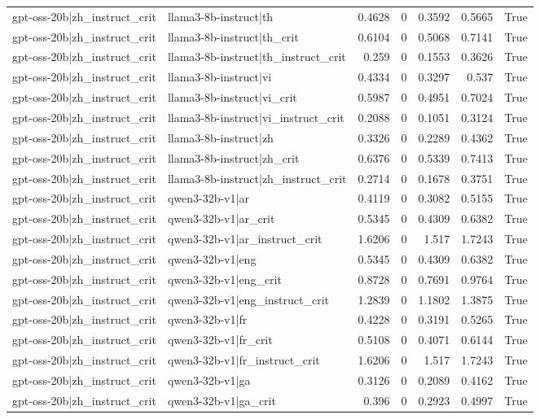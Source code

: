 \begin{table}
\begin{tabular}{l l r r r r l}
gpt-oss-20b|zh_instruct_crit & llama3-8b-instruct|th & 0.4628 & 0 & 0.3592 & 0.5665 & True \\
gpt-oss-20b|zh_instruct_crit & llama3-8b-instruct|th_crit & 0.6104 & 0 & 0.5068 & 0.7141 & True \\
gpt-oss-20b|zh_instruct_crit & llama3-8b-instruct|th_instruct_crit & 0.259 & 0 & 0.1553 & 0.3626 & True \\
gpt-oss-20b|zh_instruct_crit & llama3-8b-instruct|vi & 0.4334 & 0 & 0.3297 & 0.537 & True \\
gpt-oss-20b|zh_instruct_crit & llama3-8b-instruct|vi_crit & 0.5987 & 0 & 0.4951 & 0.7024 & True \\
gpt-oss-20b|zh_instruct_crit & llama3-8b-instruct|vi_instruct_crit & 0.2088 & 0 & 0.1051 & 0.3124 & True \\
gpt-oss-20b|zh_instruct_crit & llama3-8b-instruct|zh & 0.3326 & 0 & 0.2289 & 0.4362 & True \\
gpt-oss-20b|zh_instruct_crit & llama3-8b-instruct|zh_crit & 0.6376 & 0 & 0.5339 & 0.7413 & True \\
gpt-oss-20b|zh_instruct_crit & llama3-8b-instruct|zh_instruct_crit & 0.2714 & 0 & 0.1678 & 0.3751 & True \\
gpt-oss-20b|zh_instruct_crit & qwen3-32b-v1|ar & 0.4119 & 0 & 0.3082 & 0.5155 & True \\
gpt-oss-20b|zh_instruct_crit & qwen3-32b-v1|ar_crit & 0.5345 & 0 & 0.4309 & 0.6382 & True \\
gpt-oss-20b|zh_instruct_crit & qwen3-32b-v1|ar_instruct_crit & 1.6206 & 0 & 1.517 & 1.7243 & True \\
gpt-oss-20b|zh_instruct_crit & qwen3-32b-v1|eng & 0.5345 & 0 & 0.4309 & 0.6382 & True \\
gpt-oss-20b|zh_instruct_crit & qwen3-32b-v1|eng_crit & 0.8728 & 0 & 0.7691 & 0.9764 & True \\
gpt-oss-20b|zh_instruct_crit & qwen3-32b-v1|eng_instruct_crit & 1.2839 & 0 & 1.1802 & 1.3875 & True \\
gpt-oss-20b|zh_instruct_crit & qwen3-32b-v1|fr & 0.4228 & 0 & 0.3191 & 0.5265 & True \\
gpt-oss-20b|zh_instruct_crit & qwen3-32b-v1|fr_crit & 0.5108 & 0 & 0.4071 & 0.6144 & True \\
gpt-oss-20b|zh_instruct_crit & qwen3-32b-v1|fr_instruct_crit & 1.6206 & 0 & 1.517 & 1.7243 & True \\
gpt-oss-20b|zh_instruct_crit & qwen3-32b-v1|ga & 0.3126 & 0 & 0.2089 & 0.4162 & True \\
gpt-oss-20b|zh_instruct_crit & qwen3-32b-v1|ga_crit & 0.396 & 0 & 0.2923 & 0.4997 & True \\

\end{tabular}
\end{table}
